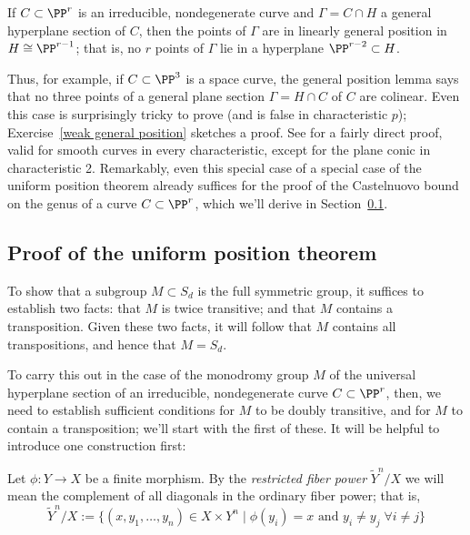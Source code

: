 \begin{lemma}\label{general position lemma}
If $C \subset \PP^r$ is an irreducible, nondegenerate curve and $\Gamma = C \cap H$ a general hyperplane section of $C$, then the points of $\Gamma$ are in linearly general position in $H \cong \PP^{r-1}$; that is, no $r$ points of $\Gamma$ lie in a hyperplane $\PP^{r-2} \subset H$.
\end{lemma}


Thus, for example, if $C \subset \PP^3$ is a space curve, the general position lemma says that no three points of a general plane section $\Gamma = H \cap C$ of $C$ are colinear. Even this case is surprisingly tricky to prove (and is false in characteristic $p$); Exercise~\ref{weak general position} sketches a proof.
See \cite[Lemma 1.1]{Rathmann} for a fairly direct proof, valid for smooth curves in every characteristic, except for the plane conic in characteristic 2.  Remarkably, even this special case of a special case of the uniform position theorem already suffices for the proof of the Castelnuovo bound on the genus of a curve $C \subset \PP^r$, which we'll derive in Section~\ref{}.

\subsection{Proof of the uniform position theorem}

To show that a subgroup $M \subset S_d$ is the full symmetric group, it suffices to establish two facts: that $M$ is twice transitive; and that $M$ contains a transposition. Given these two facts, it will follow that $M$ contains all transpositions, and hence that $M = S_d$.

To carry this out in the case of the monodromy group $M$ of the universal hyperplane section of an irreducible, nondegenerate curve $C \subset \PP^r$, then, we need to establish sufficient conditions for $M$ to be doubly transitive, and for $M$ to contain a transposition; we'll start with the first of these. It will be helpful to introduce one construction first:

\begin{definition}
Let $\phi : Y \to X$ be a finite morphism. By the \emph{restricted fiber power} $\tilde Y^n/X$ we will mean the complement of all diagonals in the ordinary fiber power; that is,
$$
\tilde Y^n/X := \{ (x, y_1,\dots, y_n) \in X \times Y^n \mid \phi(y_i) = x \text{ and } y_i \neq y_j \; \forall i \neq j \}
$$
\end{definition}

